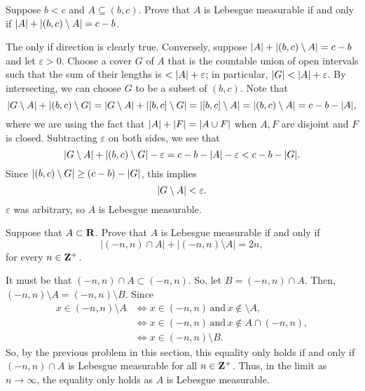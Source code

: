 \documentclass[11pt,oneside]{book}
\begin{document}
\begin{exercise}
    Suppose $b < c$ and $A \subseteq (b, c)$. Prove that $A$ is Lebesgue measurable if and only if $\lvert A\rvert + \lvert(b, c) \setminus A\rvert = c - b$.
\end{exercise}

\begin{solution}
    The only if direction is clearly true. Conversely, suppose $\lvert A\rvert + \lvert(b, c) \setminus A\rvert = c - b$ and let $\varepsilon > 0$. Choose a cover $G$ of $A$ that is the countable union of open intervals such that the sum of their lengths is $< \lvert A\rvert + \varepsilon$; in particular, $\lvert G\rvert < \lvert A\rvert + \varepsilon$. By intersecting, we can choose $G$ to be a subset of $(b, c)$. Note that \[\lvert G \setminus A\rvert + \lvert(b, c) \setminus G\rvert = \lvert G \setminus A\rvert + \lvert[b, c] \setminus G\rvert = \lvert[b, c] \setminus A\rvert = \lvert(b, c) \setminus A\rvert = c - b - \lvert A\rvert,\] where we are using the fact that $\lvert A\rvert + \lvert F\rvert = \lvert A \cup F\rvert$ when $A, F$ are disjoint and $F$ is closed. Subtracting $\varepsilon$ on both sides, we see that \[\lvert G \setminus A\rvert + \lvert(b, c) \setminus G\rvert - \varepsilon = c - b - \lvert A\rvert - \varepsilon < c - b - \lvert G\rvert.\] Since $\lvert(b, c) \setminus G\rvert \geq (c - b) - \lvert G\rvert$, this implies \[\lvert G \setminus A\rvert < \varepsilon.\] $\varepsilon$ was arbitrary, so $A$ is Lebesgue measurable.
\end{solution}

\begin{exercise}
    Suppose that $A \subset \mathbf{R}$. Prove that $A$ is Lebesgue measurable if and only if 
    \[
        |(-n,n) \cap A| + |(-n,n) \setminus A| = 2n,
    \]
    for every $n\in\mathbf{Z}^+$.
\end{exercise}
\begin{solution}
    It must be that $(-n,n) \cap A \subset (-n,n)$. So, let $B = (-n,n) \cap A$. Then,
    $(-n,n) \setminus A = (-n,n) \setminus B$. Since 
    \begin{align*}
        x \in (-n,n) \setminus A &\iff x \in (-n,n) \,\text{and}\, x\notin \setminus A, \\
        &\iff x \in (-n,n) \,\text{and}\, x \notin A \cap (-n,n), \\
        &\iff x \in (-n,n)\setminus B.
    \end{align*}
    So, by the previous problem in this section, this equality only holds if and only if $(-n,n) \cap A$ is Lebesgue 
    measurable for all $n\in \mathbf{Z}^+$. Thus, in the limit as $n\to\infty$, the equality only holds as $A$ is 
    Lebesgue measurable.
\end{solution}
\end{document}
